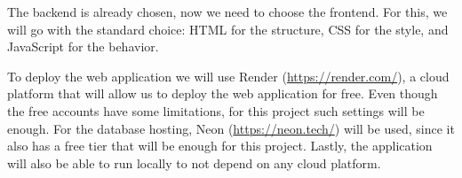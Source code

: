 The backend is already chosen, now we need to choose the frontend. For this, we will go with the standard choice: HTML for the structure, CSS for the style, and JavaScript for the behavior.

To deploy the web application we will use Render (\href{https://render.com/}{https://render.com/}), a cloud platform that will allow us to deploy the web application for free. Even though the free accounts have some limitations, for this project such settings will be enough. For the database hosting, Neon (\href{https://neon.tech/}{https://neon.tech/}) will be used, since it also has a free tier that will be enough for this project. Lastly, the application will also be able to run locally to not depend on any cloud platform.
